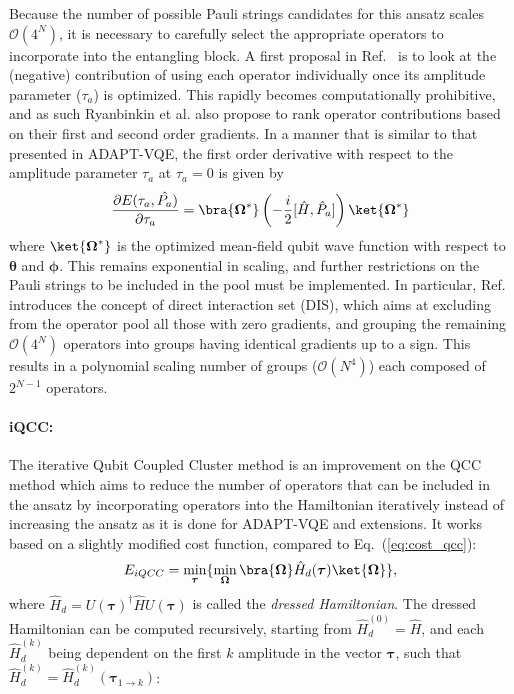 Because the number of possible Pauli strings candidates for this ansatz scales $\mathcal{O}(4^N)$, it is necessary to carefully select the appropriate operators to incorporate into the entangling block. A first proposal in Ref.~\cite{Ryabinkin2018} is to look at the (negative) contribution of using each operator individually once its amplitude parameter ($\tau_a$) is optimized. This rapidly becomes computationally prohibitive, and as such Ryanbinkin et al. \cite{Ryabinkin2018} also propose to rank operator contributions based on their first and second order gradients. In a manner that is similar to that presented in ADAPT-VQE, the first order derivative with respect to the amplitude parameter $\tau_a$ at $\tau_a = 0$ is given by
\begin{equation} \label{eq:qcc_grad}
    \frac{\partial E(\tau_a, \hat{P_a})}{\partial \tau_a} = \bra{\boldsymbol{\Omega}^*} \left(- \frac{i}{2}[ \hat{H}, \hat{P}_a] \right) \ket{\boldsymbol{\Omega}^*}
\end{equation}
where $\ket{\boldsymbol{\Omega}^*}$ is the optimized mean-field qubit wave function with respect to $\boldsymbol{\theta}$ and $\boldsymbol{\phi}$. This remains exponential in scaling, and further restrictions on the Pauli strings to be included in the pool must be implemented.
In particular, Ref.~\cite{Ryabinkin2020} introduces the concept of direct interaction set (DIS), which aims at excluding from the operator pool all those with zero gradients, and grouping the remaining $\mathcal{O}(4^N)$ operators into groups having identical gradients up to a sign. This results in a polynomial scaling number of groups ($\mathcal{O}(N^4)$) each composed of $2^{N-1}$ operators.

\paragraph{iQCC:} \label{sec:iqcc}

The iterative Qubit Coupled Cluster method \cite{Ryabinkin2020} is an improvement on the QCC method which aims to reduce the number of operators that can be included in the ansatz by incorporating operators into the Hamiltonian iteratively instead of increasing the ansatz as it is done for ADAPT-VQE and extensions. It works based on a slightly modified cost function, compared to Eq.~(\ref{eq:cost_qcc}):
\begin{align} \label{eq:cost_iqcc}
    E_{iQCC} = \min_{\boldsymbol{\tau}} \{ \min_{\boldsymbol{\Omega}} \bra{\boldsymbol{\Omega}}  \hat{H}_d(\boldsymbol{\tau})  \ket{\boldsymbol{\Omega}} \},
\end{align}
where $\hat{H}_d = U(\boldsymbol{\tau})^{\dagger} \hat{H}U(\boldsymbol{\tau})$ is called the \textit{dressed Hamiltonian}. The dressed Hamiltonian can be computed recursively, starting from $\hat{H}_d^{(0)} = \hat{H}$, and each $\hat{H}_d^{(k)}$ being dependent on the first $k$ amplitude in the vector $\boldsymbol{\tau}$, such that $\hat{H}_d^{(k)} =  \hat{H}_d^{(k)}(\boldsymbol{\tau}_{1 \rightarrow k})$:

